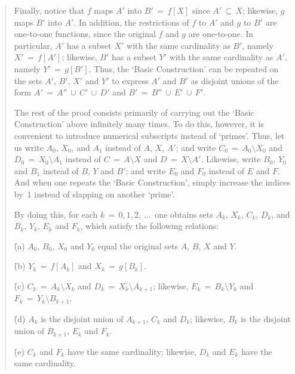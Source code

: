 \begin{quotation}
{        Finally, notice that $f$ maps $A'$ into $B' \,=\, f[X]$ since $A' \,{\subseteq}\, X$; likewise, $g$ maps $B'$ into $A'$.
    In addition, the restrictions of $f$ to $A'$ and $g$ to $B'$ are one-to-one functions, since the original $f$ and $g$ are one-to-one.
    In particular, $A'$ has a subset $X'$ with the same cardinality as $B'$, namely $X' \,=\, f[A']$;
    likewise, $B'$ has a subset $Y'$ with the same cardinality as $A'$, namely $Y' \,=\, g[B']$.
    Thus, the `Basic Construction' can be repeated on the sets $A'$, $B'$, $X'$ and $Y'$ to express $A'$ and $B'$ as disjoint unions of the form $A' \,=\, A''\,{\cup}\,C'\,{\cup}\,D'$ and $B' \,=\, B''\,{\cup}\,E'\,{\cup}\,F'$.


\V

        The rest of the proof consists primarily of carrying out the `Basic Construction' above infinitely many times.
    To do this, however, it is convenient to introduce numerical subscripts instead of `primes'.
    Thus, let us write $A_{0}$, $X_{0}$, and $A_{1}$ instead of $A$, $X$, $A'$; and write $C_{0} \,=\, A_{0}{\setminus}X_{0}$ and $D_{0} \,=\, X_{0}{\setminus}A_{1}$ 
    instead of $C \,=\, A{\setminus}X$ and $D \,=\, X{\setminus}A'$.
    Likewise, write $B_{0}$, $Y_{0}$ and $B_{1}$ instead of $B$, $Y$ and $B'$; and write $E_{0}$ and $F_{0}$ instead of $E$ and $F$.
    And when one repeats the `Basic Construction', simply increase the indices by~$1$ instead of slapping on another `prime'.

        By doing this, for each $k \,=\, 0,1,2,\,{\ldots}\,$ one obtains sets $A_{k}$, $X_{k}$, $C_{k}$, $D_{k}$, and $B_{k}$, $Y_{k}$, $E_{k}$ and $F_{k}$, which satisfy the following relations:

\V

        \h (a) $A_{0}$, $B_{0}$, $X_{0}$ and $Y_{0}$ equal the original sets $A$, $B$, $X$ and $Y$.

        \h (b) $Y_{k} \,=\, f[A_{k}]$ and $X_{k} \,=\, g[B_{k}]$.

        \h (c) $C_{k} \,=\, A_{k}{\setminus}X_{k}$ and $D_{k} \,=\, X_{k}{\setminus}A_{k+1}$;
    likewise, $E_{k} \,=\, B_{k}{\setminus}Y_{k}$ and $F_{k} \,=\, Y_{k}{\setminus}B_{k+1}$.

        \h (d) $A_{k}$ is the disjoint union of $A_{k+1}$, $C_{k}$ and $D_{k}$;
    likewise, $B_{k}$ is the disjoint union of $B_{k+1}$, $E_{k}$ and $F_{k}$.

        \h (e) $C_{k}$ and $F_{k}$ have the same cardinality; likewise, $D_{k}$ and $E_{k}$ have the same cardinality.

}
\end{quotation}
